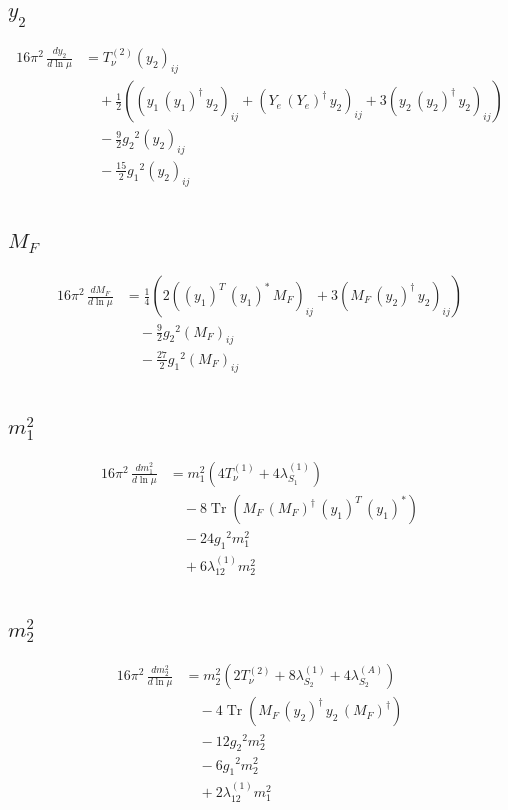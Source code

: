 \documentclass[10pt,a4paper]{article}
\begin{document}
\subsection*{$y_2$}
\begin{align*}
16\pi^2\,\frac{d y_2}{d\ln\mu} &=T_{\nu}^{(2)} \left({y_2}\right)_{ij} \\
&\quad +\frac{1}{2} (\left({y_1}\,\left({y_1}\right)^{\dagger}\,{y_2}\right)_{ij}+\left({Y_e}\,\left({Y_e}\right)^{\dagger}\,{y_2}\right)_{ij}+3 \left({y_2}\,\left({y_2}\right)^{\dagger}\,{y_2}\right)_{ij}) \\
&\quad -\frac{9}{2} {g_2}^2 \left({y_2}\right)_{ij} \\
&\quad -\frac{15}{2} {g_1}^2 \left({y_2}\right)_{ij} \\
\end{align*}
\subsection*{$M_F$}
\begin{align*}
16\pi^2\,\frac{d M_F}{d\ln\mu} &=\frac{1}{4} (2 \left(\left({y_1}\right)^{T}\,\left({y_1}\right)^{*}\,{M_F}\right)_{ij}+3 \left({M_F}\,\left({y_2}\right)^{\dagger}\,{y_2}\right)_{ij}) \\
&\quad -\frac{9}{2} {g_2}^2 \left({M_F}\right)_{ij} \\
&\quad -\frac{27}{2} {g_1}^2 \left({M_F}\right)_{ij} \\
\end{align*}
\subsection*{$m_1^2$}
\begin{align*}
16\pi^2\,\frac{d m_1^2}{d\ln\mu} &={m_1^2} (4 T_{\nu}^{(1)}+4 {\lambda_{S_1}^{(1)}}) \\
&\quad -8 \operatorname{Tr}\!\left({M_F}\,\left({M_F}\right)^{\dagger}\,\left({y_1}\right)^{T}\,\left({y_1}\right)^{*}\right) \\
&\quad -24 {g_1}^2 {m_1^2} \\
&\quad +6 {\lambda_{12}^{(1)}} {m_2^2} \\
\end{align*}
\subsection*{$m_2^2$}
\begin{align*}
16\pi^2\,\frac{d m_2^2}{d\ln\mu} &={m_2^2} (2 T_{\nu}^{(2)}+8 {\lambda_{S_2}^{(1)}}+4 {\lambda_{S_2}^{(A)}}) \\
&\quad -4 \operatorname{Tr}\!\left({M_F}\,\left({y_2}\right)^{\dagger}\,{y_2}\,\left({M_F}\right)^{\dagger}\right) \\
&\quad -12 {g_2}^2 {m_2^2} \\
&\quad -6 {g_1}^2 {m_2^2} \\
&\quad +2 {\lambda_{12}^{(1)}} {m_1^2} \\
\end{align*}
\end{document}
